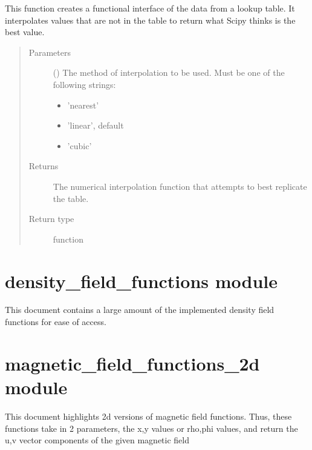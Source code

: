 \documentclass[letterpaper,10pt,english]{sphinxmanual}
\begin{document}
\begin{fulllineitems}
\begin{fulllineitems}
This function creates a functional interface of the data from a lookup
table. It interpolates values that are not in the table to return
what Scipy thinks is the best value.
\begin{quote}\begin{description}
\item[{Parameters}] \leavevmode
{} (\sphinxstyleliteralemphasis{\sphinxupquote{, }}) \textendash{} 
The method of interpolation to be used. Must be one of the
following strings:
\begin{itemize}
\item {} 
’nearest’

\item {} 
’linear’, default

\item {} 
’cubic’

\end{itemize}


\item[{Returns}] \leavevmode
{} \textendash{} The numerical interpolation function that attempts to best
replicate the table.

\item[{Return type}] \leavevmode
function

\end{description}\end{quote}

\end{fulllineitems}


\end{fulllineitems}



\section{density\_field\_functions module}
\label{\detokenize{density_field_functions:module-density_field_functions}}\label{\detokenize{density_field_functions:density-field-functions-module}}\label{\detokenize{density_field_functions::doc}}
This document contains a large amount of the implemented density field
functions for ease of access.


\section{magnetic\_field\_functions\_2d module}
\label{\detokenize{magnetic_field_functions_2d:module-magnetic_field_functions_2d}}\label{\detokenize{magnetic_field_functions_2d:magnetic-field-functions-2d-module}}\label{\detokenize{magnetic_field_functions_2d::doc}}
This document highlights 2d versions of magnetic field functions. Thus, these
functions take in 2 parameters, the x,y values or rho,phi values, and return
the u,v vector components of the given magnetic field
\end{document}
